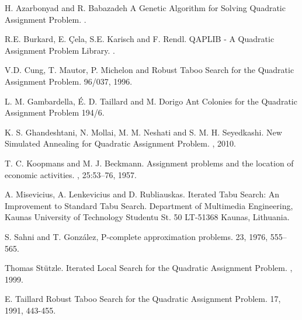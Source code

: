 \documentclass{ci5652}
\begin{document}
\begin{thebibliography}{99}

H. Azarbonyad and R. Babazadeh
\newblock A Genetic Algorithm for Solving Quadratic Assignment Problem.
.

R.E. Burkard, E. Çela, S.E. Karisch and F. Rendl.
\newblock QAPLIB - A Quadratic Assignment Problem Library.
.

V.D. Cung, T. Mautor, P. Michelon and 
\newblock Robust Taboo Search for the Quadratic Assignment Problem.
 96/037, 1996.

L. M. Gambardella, É. D. Taillard and M. Dorigo
\newblock Ant Colonies for the Quadratic Assignment Problem
 194/6.

K. S. Ghandeshtani, N. Mollai, M. M. Neshati and S. M. H. Seyedkashi.
\newblock New Simulated Annealing for Quadratic Assignment Problem.
, 2010.

T. C. Koopmans and M. J. Beckmann. 
\newblock Assignment problems and the location of economic activities.
, 25:53–76, 1957.

A. Misevicius, A. Lenkevicius and D. Rubliauskas.
\newblock Iterated Tabu Search: An Improvement to Standard Tabu Search.
\newblock Department of Multimedia Engineering, Kaunas University of Technology Studentu St. 50 LT-51368 Kaunas, Lithuania.

S. Sahni and T. González, 
\newblock P-complete approximation problems.
 23, 1976, 555–565.

Thomas Stützle.
\newblock Iterated Local Search for the Quadratic Assignment Problem.
, 1999.

E. Taillard
\newblock Robust Taboo Search for the Quadratic Assignment Problem.
 17, 1991, 443-455.


\end{thebibliography}
\end{document}
